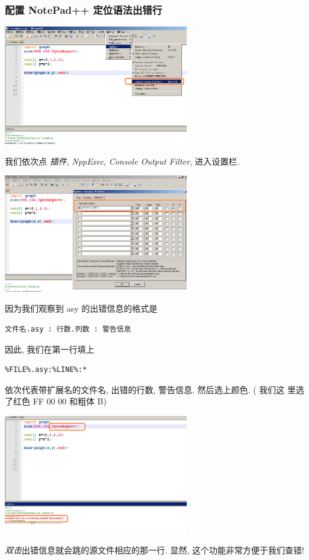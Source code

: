 \documentclass{ctexbook}
\begin{document}
\subsubsection{配置 NotePad++ 定位语法出错行}
\begin{center}
  \includegraphics[width=0.6\textwidth]{NotePad++a.png}
\end{center}
我们依次点 \emph{插件}, \emph{NppExec}, \emph{Console Output Filter},
进入设置栏.
\begin{center}
  \includegraphics[width=0.6\textwidth]{NotePad++b.png}
\end{center}
因为我们观察到 asy 的出错信息的格式是
\begin{verbatim}
文件名.asy : 行数.列数 : 警告信息
\end{verbatim}
因此, 我们在第一行填上
\begin{verbatim}
%FILE%.asy:%LINE%:*
\end{verbatim}
依次代表带扩展名的文件名, 出错的行数, 警告信息. 然后选上颜色. ( 我们这
里选了红色 FF 00 00  和粗体 B)
\begin{center}
  \includegraphics[width=0.6\textwidth]{NotePad++c.png}
\end{center}
\emph{双击}出错信息就会跳的源文件相应的那一行. 显然, 这个功能非常方便于我们查错!
\end{document}
